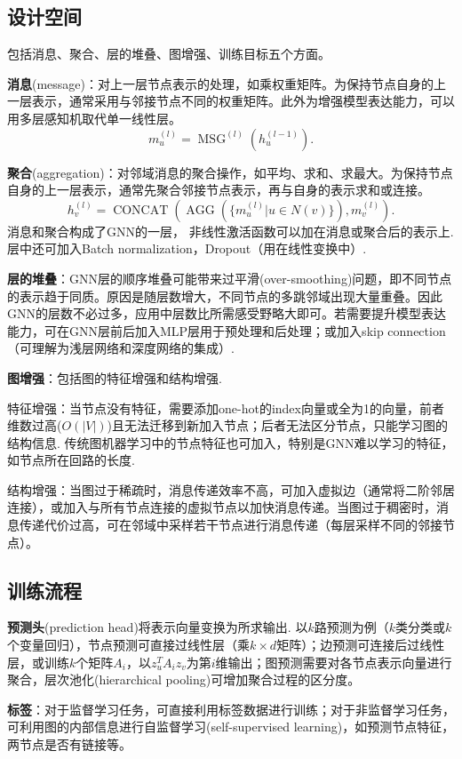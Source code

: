 \subsection{设计空间}
\par 包括消息、聚合、层的堆叠、图增强、训练目标五个方面。
\par \textbf{消息}(message)：对上一层节点表示的处理，如乘权重矩阵。为保持节点自身的上一层表示，通常采用与邻接节点不同的权重矩阵。此外为增强模型表达能力，可以用多层感知机取代单一线性层。
\begin{equation}
    m_u^{(l)}=\operatorname{MSG}^{(l)}(h_u^{(l-1)}).
\end{equation}
\par \textbf{聚合}(aggregation)：对邻域消息的聚合操作，如平均、求和、求最大。为保持节点自身的上一层表示，通常先聚合邻接节点表示，再与自身的表示求和或连接。
\begin{equation}
    h_v^{(l)}=\operatorname{CONCAT}(\operatorname{AGG}(\{m_u^{(l)}\vert u\in N(v)\}), m_v^{(l)}).
\end{equation}
消息和聚合构成了GNN的一层， 非线性激活函数可以加在消息或聚合后的表示上. 层中还可加入Batch normalization，Dropout（用在线性变换中）.
\par \textbf{层的堆叠}：GNN层的顺序堆叠可能带来过平滑(over-smoothing)问题，即不同节点的表示趋于同质。原因是随层数增大，不同节点的多跳邻域出现大量重叠。因此GNN的层数不必过多，应用中层数比所需感受野略大即可。若需要提升模型表达能力，可在GNN层前后加入MLP层用于预处理和后处理；或加入skip connection（可理解为浅层网络和深度网络的集成）.

\par \textbf{图增强}：包括图的特征增强和结构增强.
\par 特征增强：当节点没有特征，需要添加one-hot的index向量或全为1的向量，前者维数过高($O(\vert V\vert)$)且无法迁移到新加入节点；后者无法区分节点，只能学习图的结构信息. 传统图机器学习中的节点特征也可加入，特别是GNN难以学习的特征，如节点所在回路的长度. 
\par 结构增强：当图过于稀疏时，消息传递效率不高，可加入虚拟边（通常将二阶邻居连接），或加入与所有节点连接的虚拟节点以加快消息传递。当图过于稠密时，消息传递代价过高，可在邻域中采样若干节点进行消息传递（每层采样不同的邻接节点）。

\subsection{训练流程}
\par \textbf{预测头}(prediction head)将表示向量变换为所求输出. 以$k$路预测为例（$k$类分类或$k$个变量回归），节点预测可直接过线性层（乘$k\times d$矩阵）；边预测可连接后过线性层，或训练$k$个矩阵$A_i$，以$z_u^T A_i z_v$为第$i$维输出；图预测需要对各节点表示向量进行聚合，层次池化(hierarchical pooling)可增加聚合过程的区分度。
\par \textbf{标签}：对于监督学习任务，可直接利用标签数据进行训练；对于非监督学习任务，可利用图的内部信息进行自监督学习(self-supervised learning)，如预测节点特征，两节点是否有链接等。


